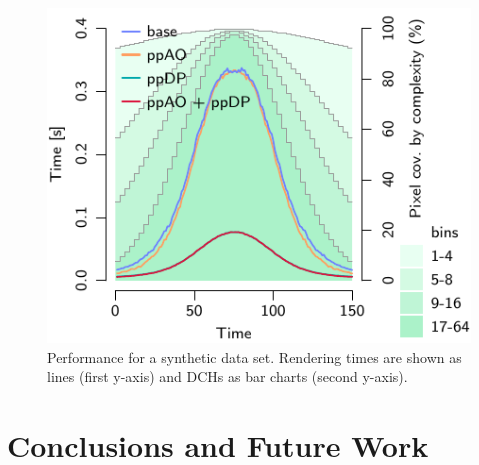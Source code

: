 \documentclass{egpubl}
\newcommand{\todo}[1]{{\color{red}\emph{(#1)}}}
\newcommand{\dch}{DCH}
\begin{document}
\begin{figure}[t]
\begin{minipage}{1.0\linewidth}
    \includegraphics[width=\linewidth]{figures/plot-viewdep-quad-tall} 
  \end{minipage}
  \caption{\label{fig:viewdep-quad}%
    Performance for a synthetic data set.
    Rendering times are shown as lines (first y-axis) and \dch{}s as bar charts (second y-axis). 
  }
\end{figure}


\section{Conclusions and Future Work}
\label{sec:conclusion}

%
\end{document}
